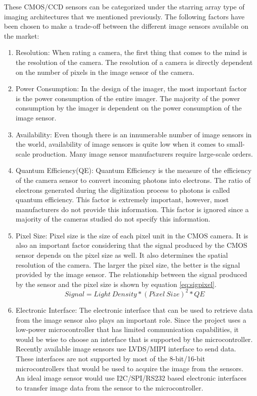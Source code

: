These CMOS/CCD sensors can be categorized under the starring array type of imaging architectures that we mentioned previously. The following factors have been chosen to  make a trade-off between the different image sensors available on the market:
\begin{enumerate}
\item Resolution: When rating a camera, the first thing that comes to the mind is the resolution of the camera. The resolution of a camera is directly dependent on the number of pixels in the image sensor of the camera. 
\item Power Consumption: In the design of the imager, the most important factor is the power consumption of the entire imager. The majority of the power consumption by the imager is dependent on the power consumption of the image sensor. 
\item Availability: Even though there is an innumerable number of image sensors in the world, availability of image sensors is quite low when it comes to small-scale production. Many image sensor manufacturers require large-scale orders.
\item Quantum Efficiency(QE): Quantum Efficiency is the measure of the efficiency of the camera sensor to convert incoming photons into electrons. The ratio of electrons generated during the digitization process to photons is called quantum efficiency. This factor is extremely important, however, most manufacturers do not provide this information. This factor is ignored since a majority of the cameras studied do not specify this information.
\item Pixel Size: Pixel size is the size of each pixel unit in the CMOS camera. It is also an important factor considering that the signal produced by the CMOS sensor depends on the pixel size as well. It also determines the spatial resolution of the camera. The larger the pixel size, the better is the signal provided by the image sensor. The relationship between the signal produced by the sensor and the pixel size is shown by equation \ref{eq:sigpixel}.
\begin{equation}
Signal = Light \ Density * (Pixel\ Size)^2 * QE
\label{eq:sigpixel}
\end{equation}
\item Electronic Interface: The electronic interface that can be used to retrieve data from the image sensor also plays an important role. Since the project uses a low-power microcontroller that has limited communication capabilities, it would be wise to choose an interface that is supported by the microcontroller. Recently available image sensors use LVDS/MIPI interface to send data. These interfaces are not supported by most of the 8-bit/16-bit microcontrollers that would be used to acquire the image from the sensors. An ideal image sensor would use I2C/SPI/RS232 based electronic interfaces to transfer image data from the sensor to the microcontroller.


\end{enumerate}
